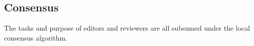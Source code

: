 \documentclass[14pt]{article}
\begin{document}
\subsection{Consensus}
The tasks and purpose of editors and reviewers are all subsumed under the local consensus algorithm.






















\end{document}
